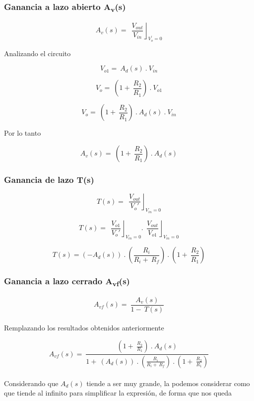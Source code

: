 \documentclass[12pt,a4paper]{article}
\begin{document}
\subsubsection{\texorpdfstring{Ganancia a lazo abierto
A\textsubscript{v}(s)}{Ganancia a lazo abierto Av(s)}}\label{ganancia-a-lazo-abierto-avs}

\[A_{v}(s) = \ \left. \ \frac{V_{out}}{V_{in}} \right\rfloor_{V_{o}^{'} = 0}\]

Analizando el circuito

\[V_{o1} = \ A_{d}(s)\ .\ V_{in}\]

\[V_{o} = \ \left( 1 + \ \frac{R_{2}}{R_{1}} \right)\ .\ V_{o1}\]

\[V_{o} = \ \left( 1 + \ \frac{R_{2}}{R_{1}} \right)\ .\ A_{d}(s)\ .\ V_{in}\]

Por lo tanto

\[A_{v}(s) = \ \left( 1 + \ \frac{R_{2}}{R_{1}} \right)\ .\ A_{d}(s)\]

\subsubsection{Ganancia de lazo T(s)}\label{ganancia-de-lazo-ts}

\[T(s) = \ \left. \ \frac{V_{out}}{V_{o}'} \right\rfloor_{V_{in} = 0}\]

\[T(s) = \ \left. \ \frac{V_{o1}}{V_{o}'} \right\rfloor_{V_{in} = 0}.\ \left. \ \frac{V_{out}}{V_{o1}} \right\rfloor_{V_{in} = 0}\]

\[T(s) = \left( - A_{d}(s) \right)\ .\ \left( \frac{R_{i}}{R_{i} + \ R_{f}} \right)\ .\ \left( 1 + \ \frac{R_{2}}{R_{1}} \right)\]

\subsubsection{\texorpdfstring{Ganancia a lazo cerrado
A\textsubscript{vf}(s)}{Ganancia a lazo cerrado Avf(s)}}\label{ganancia-a-lazo-cerrado-avfs}

\[A_{vf}(s) = \ \frac{A_{v}(s)}{1 - \ T(s)}\] \\

Remplazando los resultados obtenidos anteriormente

\[A_{vf}(s) = \ \frac{\left( 1 + \ \frac{R_{2}}{R_{1}} \right)\ .\ A_{d}(s)}{1 + \ \left( A_{d}(s) \right)\ .\ \left( \frac{R_{i}}{R_{i} + \ R_{f}} \right)\ .\ \left( 1 + \ \frac{R_{2}}{R_{1}} \right)}\] \\

Considerando que \(A_{d}(s)\) tiende a ser muy grande, la podemos
considerar como que tiende al infinito para simplificar la expresión, de
forma que nos queda
\end{document}
